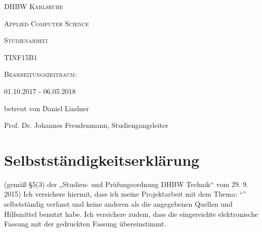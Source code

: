 \makeatletter
\begin{titlepage}
\centering
	{\scshape\LARGE DHBW Karlsruhe \par}
	{\scshape Applied Computer Science \par}
	\vspace{1cm}
	{\scshape\Large Studienarbeit\par}
	\vspace{1.5cm}
	{\huge\textbf{\@title} \par}
	\vspace{2cm}
	{\Large \@author \par}
	{\Large TINF15B1 \par}
	\vspace{6cm}
	
	{\scshape
	Bearbeitungszeitraum:\par
	01.10.2017 - 06.05.2018\par
	betreut von Daniel Lindner \par 
	Prof. Dr. Johannes Freudenmann, Studiengangsleiter}

\end{titlepage}

\section*{Selbstständigkeitserklärung}
(gemäß §5(3) der „Studien- und Prüfungsordnung DHBW Technik“ vom 29. 9. 2015)
Ich versichere hiermit, dass ich meine Projektarbeit mit dem Thema: "`\@title"' selbstständig verfasst und keine anderen als die angegebenen Quellen und Hilfsmittel benutzt habe. Ich versichere zudem, dass die eingereichte elektronische Fassung mit der gedruckten Fassung übereinstimmt.

\vspace{2 cm}
